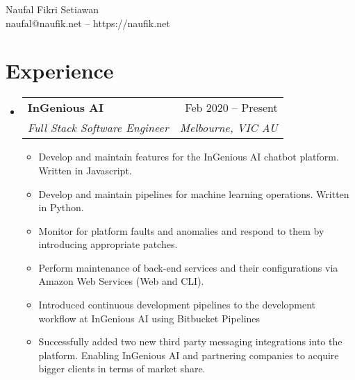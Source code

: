 \documentclass[letterpaper,10pt]{article}
\makeatletter
\newcommand{\resumeItem}[1]{
  \item\small{
    {#1 \vspace{-2pt}}
  }
}
\newcommand{\resumeSubheading}[4]{
  \vspace{-2pt}\item
    \begin{tabular*}{0.97\textwidth}[t]{l@{\extracolsep{\fill}}r}
      \textbf{#1} & #2 \\
      \textit{\small#3} & \textit{\small #4} \\
    \end{tabular*}\vspace{-7pt}
}
\newcommand{\resumeSubHeadingListStart}{\begin{itemize}[leftmargin=0.15in, label={}]}
\newcommand{\resumeSubHeadingListEnd}{\end{itemize}}
\newcommand{\resumeItemListStart}{\begin{itemize}}
\newcommand{\resumeItemListEnd}{\end{itemize}\vspace{-5pt}}
\makeatother
\begin{document}
\begin{center}
    {\LARGE Naufal Fikri Setiawan}\\
    naufal@naufik.net -- https://naufik.net
\end{center}


\vspace{-2pt}

\section{Experience}
  \resumeSubHeadingListStart
    \resumeSubheading
      {InGenious AI}{Feb 2020 -- Present}
      {Full Stack Software Engineer}{Melbourne, VIC AU}
      \resumeItemListStart
        \resumeItem{Develop and maintain features for the InGenious AI chatbot platform. Written in Javascript.}
        \resumeItem{Develop and maintain pipelines for machine learning operations. Written in Python.}
        \resumeItem{Monitor for platform faults and anomalies and respond to them by introducing appropriate patches.}
        \resumeItem{Perform maintenance of back-end services and their configurations via Amazon Web Services (Web and CLI).}
        \resumeItem{Introduced continuous development pipelines to the development workflow at InGenious AI using Bitbucket Pipelines}
        \resumeItem{Successfully added two new third party messaging integrations into the platform. Enabling InGenious AI and partnering companies to
        acquire bigger clients in terms of market share.}
    \resumeItemListEnd

  \resumeSubHeadingListEnd
  
\end{document}
